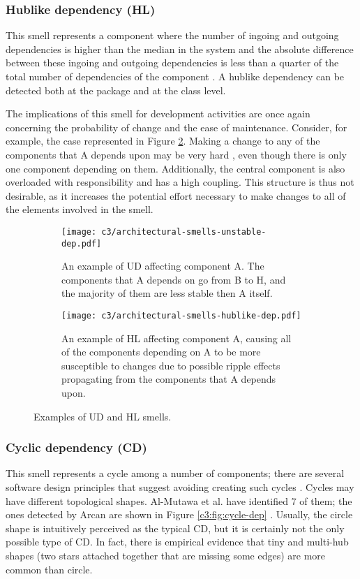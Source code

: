 \subsubsection{Hublike dependency (HL)}\label{c3:sec:arch-smells-hl}
This smell represents a component where the number of ingoing and outgoing dependencies is higher than the median in the system and the absolute difference between these ingoing and outgoing dependencies is less than a quarter of the total number of dependencies of the component \cite{Arcelli2016}. A hublike dependency can be detected both at the package and at the class level.

The implications of this smell for development activities are once again concerning the probability of change and the ease of maintenance. Consider, for example, the case represented in Figure \ref{c3:fig:hublike-dep}.
Making a change to any of the components that A depends upon may be very hard \cite{Martin2018}, even though there is only one component depending on them.
Additionally, the central component is also overloaded with responsibility and has a high coupling.
This structure is thus not desirable, as it increases the potential effort necessary to make changes to all of the elements involved in the smell.
\begin{figure}
    \centering
	\begin{subfigure}[b]{0.85\linewidth}
		\centering
		\texttt{[image: c3/architectural-smells-unstable-dep.pdf]}
		\caption{An example of UD affecting component A. The components that A depends on go from B to H, and the majority of them are less stable then A itself.}\label{c3:fig:unstable-dep}
	\end{subfigure}
	\begin{subfigure}[b]{0.85\linewidth}
		\centering
		\texttt{[image: c3/architectural-smells-hublike-dep.pdf]}
		\caption{An example of HL affecting component A, causing all of the components depending on A to be more susceptible to changes due to possible ripple effects propagating from the components that A  depends upon.}\label{c3:fig:hublike-dep}
	\end{subfigure} 
    \caption{Examples of UD and HL smells.}
    \label{c3:fig:architectural smells} 
\end{figure}

\subsubsection{Cyclic dependency (CD)}\label{c3:sec:arch-smells-cd}
This smell represents a cycle among a number of components; there are several software design principles that suggest avoiding creating such cycles \cite{Lippert2006,Parnas1979,Stevens1974,Martin2018}.
Cycles may have different topological shapes. Al-Mutawa et al. \cite{AlMutawa2014} have identified 7 of them; the ones detected by Arcan are shown in Figure \ref{c3:fig:cycle-dep} \cite{Arcelli2017}.
Usually, the circle shape is intuitively perceived as the typical CD, but it is certainly not the only possible type of CD. In fact, there is empirical evidence \cite{AlMutawa2014} that tiny and multi-hub shapes (two stars attached together that are missing some edges) are more common than circle.


